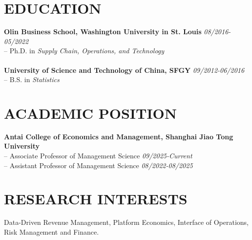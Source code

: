 \documentclass[margin]{res} %
\begin{document}
\begin{resume}

%    



    \section{\textbf{EDUCATION}}
    {\bf Olin Business School, Washington University in St. Louis} \hfill {\em 08/2016-05/2022} \\ 
    -- Ph.D. in {\it Supply Chain, Operations, and Technology} \\
    ~
    \\
    {\bf University of Science and Technology of China, SFGY} \hfill {\em 09/2012-06/2016} \\ 
    -- B.S. in {\it Statistics}\\


    \section{\textbf{ACADEMIC POSITION}}
    {\bf Antai College of Economics and Management, Shanghai Jiao Tong University} \\ 
    -- Associate Professor of Management Science \hfill {\em 09/2025-Current}\\
    -- Assistant Professor of Management Science \hfill {\em 08/2022-08/2025}\\

    \section{RESEARCH INTERESTS} 
    Data-Driven Revenue Management, Platform Economics, Interface of Operations, Risk Management and Finance.


\end{resume}
\end{document}
